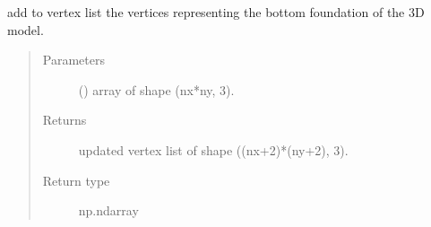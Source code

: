 \documentclass[letterpaper,10pt,english]{sphinxmanual}
\begin{document}
\begin{fulllineitems}
\label{\detokenize{stlutils:stlutils.add_foundation}}
\sphinxAtStartPar
add to vertex list the vertices representing the bottom foundation of the 3D model.
\begin{quote}\begin{description}
\item[{Parameters}] \leavevmode
\sphinxAtStartPar
{} () \textendash{} array of shape (nx*ny, 3).

\item[{Returns}] \leavevmode
\sphinxAtStartPar
updated vertex list of shape ((nx+2)*(ny+2), 3).

\item[{Return type}] \leavevmode
\sphinxAtStartPar
np.ndarray

\end{description}\end{quote}

\end{fulllineitems}

\end{document}
